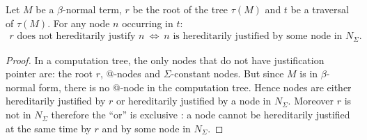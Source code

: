 \begin{lem}
\label{lem:betaeta_trav}
Let $M$ be a $\beta$-normal term, $r$ be the root of the tree $\tau(M)$ and
$t$ be a traversal of $\tau(M)$.
For any node $n$ occurring in $t$:
\begin{eqnarray*}
r \mbox{ does not hereditarily justify } n  \  \iff \   n \mbox{ is
hereditarily justified by some node in } N_\Sigma.
\end{eqnarray*}
%
\end{lem}
\begin{proof}
 In a computation tree, the only nodes that do not have justification pointer are:
the root $r$, @-nodes and $\Sigma$-constant nodes. But since $M$ is
in $\beta$-normal form, there is no @-node in the computation tree.
Hence nodes are either hereditarily justified by $r$ or hereditarily
justified by a node in $N_\Sigma$. Moreover $r$ is not in $N_\Sigma$
therefore the ``or'' is exclusive : a node cannot be hereditarily
justified at the same time by $r$ and by some node in $N_\Sigma$.


\end{proof}


